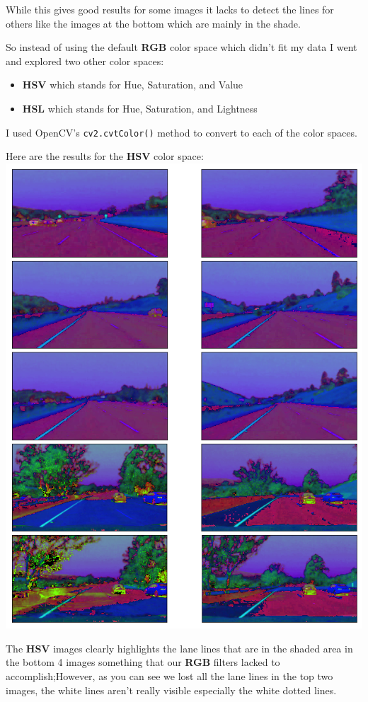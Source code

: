 \documentclass[11pt]{article}
\makeatletter
\def\maxwidth{\ifdim\Gin@nat@width>\linewidth\linewidth
    \else\Gin@nat@width\fi}
\let\Oldincludegraphics\includegraphics
\renewcommand{\includegraphics}[1]{\Oldincludegraphics[width=.8\maxwidth]{#1}}
\providecommand{\tightlist}{%
      \setlength{\itemsep}{0pt}\setlength{\parskip}{0pt}}
\makeatother
\begin{document}
While this gives good results for some images it lacks to detect the
lines for others like the images at the bottom which are mainly in the
shade.

So instead of using the default \textbf{RGB} color space which didn't
fit my data I went and explored two other color spaces:

\begin{itemize}
\tightlist
\item
  \textbf{HSV} which stands for Hue, Saturation, and Value
\item
  \textbf{HSL} which stands for Hue, Saturation, and Lightness
\end{itemize}

I used OpenCV's \texttt{cv2.cvtColor()} method to convert to each of the
color spaces.

Here are the results for the \textbf{HSV} color space:
\includegraphics{test_images_output/hsv_test_images.png}

The \textbf{HSV} images clearly highlights the lane lines that are in
the shaded area in the bottom 4 images something that our \textbf{RGB}
filters lacked to accomplish;However, as you can see we lost all the
lane lines in the top two images, the white lines aren't really visible
especially the white dotted lines.
\end{document}
